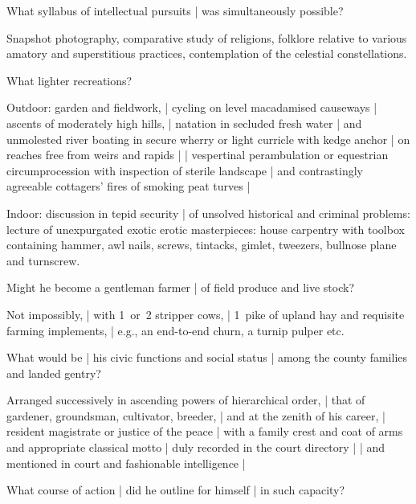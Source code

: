 
What syllabus of intellectual pursuits |
was simultaneously possible?

\Philosophy
Snapshot photography,
comparative study of religions,
folklore relative to various amatory and superstitious practices,
contemplation of the celestial constellations.


What lighter recreations?

\Poetry
Outdoor:
garden and fieldwork, |
cycling on level macadamised causeways |
ascents of moderately high hills, |
natation in secluded fresh water |
and unmolested river boating in secure wherry
or light curricle with kedge anchor |
on reaches free from weirs and rapids |
 |
vespertinal perambulation
or equestrian circumprocession with inspection of sterile landscape |
and contrastingly agreeable cottagers' fires of smoking peat turves |

\Household
Indoor:
discussion in tepid security |
of unsolved historical and criminal problems:
lecture of unexpurgated exotic erotic masterpieces:
house carpentry with toolbox
containing hammer, awl nails, screws, tintacks,
gimlet, tweezers, bullnose plane and turnscrew.


Might he become a gentleman farmer |
of field produce and live stock?

\Household
Not impossibly, |
with 1~or~2 stripper cows, |
1~pike of upland hay and requisite farming implements, |
e.g., an end-to-end churn,
a turnip pulper etc.


What would be |
his civic functions and social status |
among the county families and landed gentry?

\Poetry[~(emotion)]
Arranged successively in ascending powers of hierarchical order, |
that of gardener, groundsman, cultivator, breeder, |
and at the zenith of his career, |
resident magistrate or justice of the peace |
with a family crest and coat of arms
and appropriate classical motto
 |
duly recorded in the court directory |
 |
and mentioned in court and fashionable intelligence |


What course of action |
did he outline for himself |
in such capacity?

